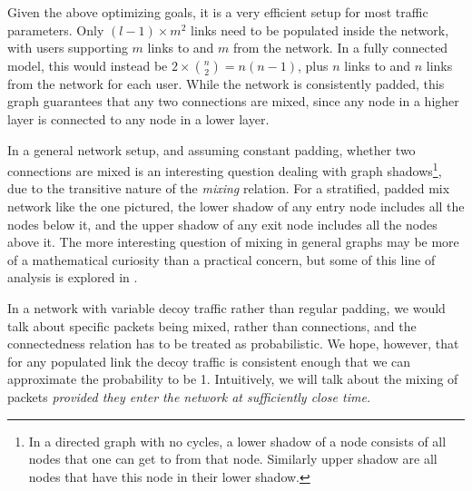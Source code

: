 \documentclass{article}
\begin{document}
\noindent Given the above optimizing goals, it is a very efficient setup for most traffic parameters. 
Only $(l-1)\times m^2$ links need to be populated inside the network, with users supporting $m$ links to and $m$ from the network. In a fully connected model, this would instead be $2\times {n\choose 2}=n(n-1)$, plus $n$ links to and $n$ links from the network for each user. While the network is consistently padded,
this graph guarantees that any two connections are mixed, since any node in a higher layer is connected to any node in a lower layer.\medskip

\noindent In a general network setup, and assuming constant padding, whether two connections are mixed is an interesting question dealing with graph shadows\footnote{In a directed graph with no cycles, a lower shadow of a node consists of all nodes that one can get to from that node. Similarly upper shadow are all nodes that have this node in their lower shadow.}, due to the transitive nature of the \textit{mixing} relation. For a stratified, padded mix network like the one pictured, the lower shadow of any entry node includes all the nodes below it, and the upper shadow of any exit node includes all the nodes above it. The more interesting question of mixing in general graphs may be more of a mathematical curiosity than a practical concern, but some of this line of analysis is explored in . 

In a network with variable decoy traffic rather than regular padding, we would talk about specific packets being mixed, rather than connections, and the connectedness relation has to be treated as probabilistic. We hope, however, that for any populated link the decoy traffic is consistent enough that we can approximate the probability to be 1. Intuitively, we will talk about the mixing of packets \textit{provided they enter the network at sufficiently close time.}


\end{document}
